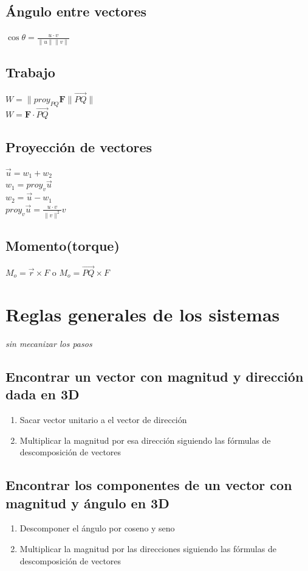 \documentclass[letterpaper,12pt]{article}
\begin{document}
\begin{sloppypar}
\subsection*{\textbf{Ángulo entre vectores}}
$\displaystyle \cos \theta = \frac{u \cdot v}{\|u\| \|v\|}$

\subsection*{\textbf{Trabajo}}
$W = \|proy_{PQ}\textbf{F} \|\vec{PQ}\|$ 
\vspace{0.3cm}\\
$W = \textbf{F} \cdot \vec{PQ}$

\subsection*{\textbf{Proyección de vectores}}
$\vec{u} = w_1+w_2$
\vspace{0.3cm}\\ 
$w_1 = proy_{v}\vec{u}$
\vspace{0.3cm}\\ 
$w_2 = \vec{u} - w_1$
\vspace{0.3cm}\\ 
$\displaystyle proy_{v}\vec{u} = \frac{u \cdot v}{\|v\|^2} v$ 

\subsection*{\textbf{Momento(torque)}}
$M_o = \vec{r} \times F$ o $M_o = \vec{PQ} \times F$


\newpage
\section*{Reglas generales de los sistemas}
\textit{sin mecanizar los pasos}
\subsection*{Encontrar un vector con magnitud y dirección dada en 3D}
\begin{enumerate}
    \item Sacar vector unitario a el vector de dirección 
    \item Multiplicar la magnitud por esa dirección siguiendo las fórmulas de descomposición de vectores
\end{enumerate}
\subsection*{Encontrar los componentes de un vector con magnitud y ángulo en 3D}
\begin{enumerate}
    \item Descomponer el ángulo por coseno y seno
    \item Multiplicar la magnitud por las direcciones siguiendo las fórmulas de descomposición de vectores 
\end{enumerate}

\end{sloppypar}
\end{document}
